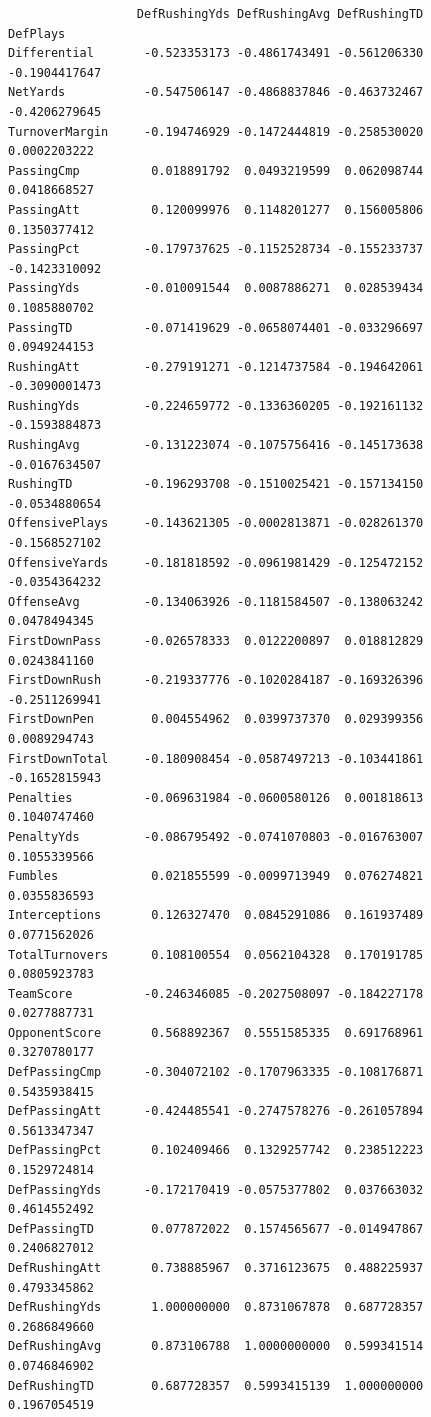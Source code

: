 \documentclass[
  letterpaper,
  DIV=11,
  numbers=noendperiod]{scrreprt}
\begin{document}
\begin{verbatim}
                  DefRushingYds DefRushingAvg DefRushingTD      DefPlays
Differential       -0.523353173 -0.4861743491 -0.561206330 -0.1904417647
NetYards           -0.547506147 -0.4868837846 -0.463732467 -0.4206279645
TurnoverMargin     -0.194746929 -0.1472444819 -0.258530020  0.0002203222
PassingCmp          0.018891792  0.0493219599  0.062098744  0.0418668527
PassingAtt          0.120099976  0.1148201277  0.156005806  0.1350377412
PassingPct         -0.179737625 -0.1152528734 -0.155233737 -0.1423310092
PassingYds         -0.010091544  0.0087886271  0.028539434  0.1085880702
PassingTD          -0.071419629 -0.0658074401 -0.033296697  0.0949244153
RushingAtt         -0.279191271 -0.1214737584 -0.194642061 -0.3090001473
RushingYds         -0.224659772 -0.1336360205 -0.192161132 -0.1593884873
RushingAvg         -0.131223074 -0.1075756416 -0.145173638 -0.0167634507
RushingTD          -0.196293708 -0.1510025421 -0.157134150 -0.0534880654
OffensivePlays     -0.143621305 -0.0002813871 -0.028261370 -0.1568527102
OffensiveYards     -0.181818592 -0.0961981429 -0.125472152 -0.0354364232
OffenseAvg         -0.134063926 -0.1181584507 -0.138063242  0.0478494345
FirstDownPass      -0.026578333  0.0122200897  0.018812829  0.0243841160
FirstDownRush      -0.219337776 -0.1020284187 -0.169326396 -0.2511269941
FirstDownPen        0.004554962  0.0399737370  0.029399356  0.0089294743
FirstDownTotal     -0.180908454 -0.0587497213 -0.103441861 -0.1652815943
Penalties          -0.069631984 -0.0600580126  0.001818613  0.1040747460
PenaltyYds         -0.086795492 -0.0741070803 -0.016763007  0.1055339566
Fumbles             0.021855599 -0.0099713949  0.076274821  0.0355836593
Interceptions       0.126327470  0.0845291086  0.161937489  0.0771562026
TotalTurnovers      0.108100554  0.0562104328  0.170191785  0.0805923783
TeamScore          -0.246346085 -0.2027508097 -0.184227178  0.0277887731
OpponentScore       0.568892367  0.5551585335  0.691768961  0.3270780177
DefPassingCmp      -0.304072102 -0.1707963335 -0.108176871  0.5435938415
DefPassingAtt      -0.424485541 -0.2747578276 -0.261057894  0.5613347347
DefPassingPct       0.102409466  0.1329257742  0.238512223  0.1529724814
DefPassingYds      -0.172170419 -0.0575377802  0.037663032  0.4614552492
DefPassingTD        0.077872022  0.1574565677 -0.014947867  0.2406827012
DefRushingAtt       0.738885967  0.3716123675  0.488225937  0.4793345862
DefRushingYds       1.000000000  0.8731067878  0.687728357  0.2686849660
DefRushingAvg       0.873106788  1.0000000000  0.599341514  0.0746846902
DefRushingTD        0.687728357  0.5993415139  1.000000000  0.1967054519

\end{verbatim}
\end{document}
